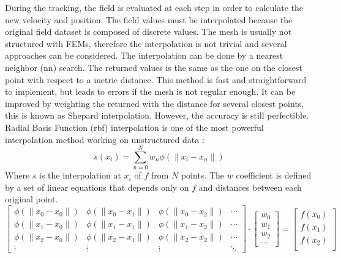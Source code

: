 \begin{refsection}
	During the tracking, the field is evaluated at each step in order to calculate the new velocity and position. The field values must be interpolated because the original field dataset is composed of discrete values. The mesh is usually not structured with FEMs, therefore the interpolation is not trivial and several approaches can be considered. The interpolation can be done by a nearest neighbor (\acrshort{nn}) search. The returned values is the same as the one on the closest point with respect to a metric distance. This method is fast and straightforward to implement, but leads to errors if the mesh is not regular enough. It can be improved by weighting the returned with the distance for several closest points, this is known as Shepard interpolation. However, the accuracy is still perfectible. Radial Basis Function (\acrshort{rbf}) interpolation is one of the most powerful interpolation method working on unstructured data \cite{Wright2003}:
	\begin{equation}
		s(x_{i}) = \sum_{n=0}^{N} w_{n} \phi(\lVert x_{i} - x_{n}\rVert)
	\end{equation}
	Where $s$ is the interpolation at $x_{i}$ of $f$ from $N$ points.
	The $w$ coefficient is defined by a set of linear equations that depends only on $f$ and distances between each original point.
	\begin{equation}
		\begin{bmatrix}
			\phi(\lVert x_{0} - x_{0}\rVert) & \phi(\lVert x_{0} - x_{1}\rVert) & \phi(\lVert x_{0} - x_{2}\rVert) & \cdots \\
			\phi(\lVert x_{1} - x_{0}\rVert) & \phi(\lVert x_{1} - x_{1}\rVert) & \phi(\lVert x_{1} - x_{2}\rVert) & \cdots \\
			\phi(\lVert x_{2} - x_{0}\rVert) & \phi(\lVert x_{2} - x_{1}\rVert) & \phi(\lVert x_{2} - x_{2}\rVert) & \cdots \\
			\vdots                           & \vdots                           & \vdots                           & \ddots
		\end{bmatrix}
		\cdot
		\begin{bmatrix}
			w_{0} \\
			w_{1} \\
			w_{2} \\
			\cdots
		\end{bmatrix}
		=
		\begin{bmatrix}
			f(x_{0}) \\
			f(x_{1}) \\
			f(x_{2}) \\

\end{bmatrix}
\end{equation}
\end{refsection}
